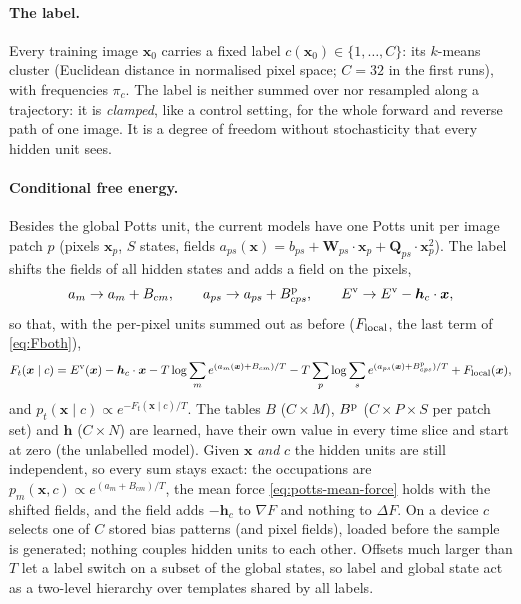 \documentclass[11pt,a4paper]{article}
\newcommand{\vx}{\bm{x}}
\newcommand{\Ev}{E^{\mathrm{v}}}
\newcommand{\grad}{\nabla}
\begin{document}
\paragraph{The label.} Every training image $\vx_0$ carries a fixed label $c(\vx_0)\in\{1,\dots,C\}$: its
$k$-means cluster (Euclidean distance in normalised pixel space; $C=32$ in the first runs), with frequencies
$\pi_c$. The label is neither summed over nor resampled along a trajectory: it is \emph{clamped}, like a control
setting, for the whole forward and reverse path of one image. It is a degree of freedom without stochasticity that
every hidden unit sees.

\paragraph{Conditional free energy.} Besides the global Potts unit, the current models have one Potts unit per
image patch $p$ (pixels $\vx_p$, $S$ states, fields $a_{ps}(\vx)=b_{ps}+\bm W_{ps}\cdot\vx_p+\bm Q_{ps}\cdot\vx_p^2$).
The label shifts the fields of all hidden states and adds a field on the pixels,
\begin{equation}
  a_m\to a_m+B_{cm},\qquad a_{ps}\to a_{ps}+B^{\rm p}_{cps},\qquad \Ev\to\Ev-\bm h_c\cdot\vx ,
\end{equation}
so that, with the per-pixel units summed out as before ($F_{\rm local}$, the last term of \eqref{eq:Fboth}),
\begin{equation}
  F_t(\vx\mid c)=\Ev(\vx)-\bm h_c\cdot\vx-T\log\sum_me^{(a_m(\vx)+B_{cm})/T}
  -T\sum_p\log\sum_se^{(a_{ps}(\vx)+B^{\rm p}_{cps})/T}+F_{\rm local}(\vx),
  \label{eq:Fcond}
\end{equation}
and $p_t(\vx\mid c)\propto e^{-F_t(\vx\mid c)/T}$. The tables $B$ ($C\times M$), $B^{\rm p}$ ($C\times P\times S$ per patch
set) and $\bm h$ ($C\times N$) are learned, have their own value in every time slice and start at zero (the unlabelled
model). Given $\vx$ \emph{and} $c$ the hidden units are still independent, so every sum stays exact: the occupations
are $p_m(\vx,c)\propto e^{(a_m+B_{cm})/T}$, the mean force \eqref{eq:potts-mean-force} holds with the shifted fields,
and the field adds $-\bm h_c$ to $\grad F$ and nothing to $\Delta F$. On a device $c$ selects one of $C$ stored bias
patterns (and pixel fields), loaded before the sample is generated; nothing couples hidden units to each other.
Offsets much larger than $T$ let a label switch on a subset of the global states, so label and global state act as
a two-level hierarchy over templates shared by all labels.
\end{document}
